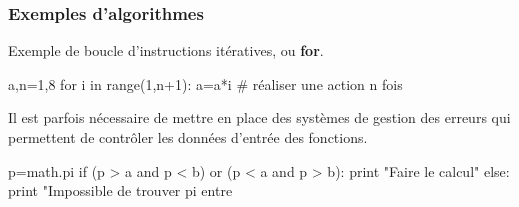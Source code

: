 \begin{frame}[fragile]
\frametitle{Exemples d'algorithmes}

Exemple de boucle d'instructions itératives, ou \textbf{for}.

\begin{GrayBox}[0.75\textwidth]
\begin{verbatimtab}[3]
a,n=1,8
for i in range(1,n+1):
	a=a*i # réaliser une action n fois
\end{verbatimtab}
\end{GrayBox}

Il est parfois nécessaire de mettre en place des systèmes de gestion des erreurs qui permettent de contrôler les données d'entrée des fonctions.

\begin{GrayBox}[0.8\textwidth]
\begin{verbatimtab}[3]
p=math.pi
if (p > a and p < b) or (p < a and p > b):
    print "Faire le calcul"
else:
    print "Impossible de trouver pi entre %
\end{verbatimtab}
\end{GrayBox}

\vspace{-0.5cm}

\end{frame}




